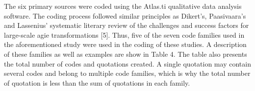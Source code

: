 The six primary sources were coded using the Atlas.ti qualitative data
analysis software. The coding process followed similar principles as
Dikert's, Paasivaara's and Lassenius' systematic literary review of the
challenges and success factors for large-scale agie transformations
[5]. Thus, five of the seven code families used in the aforementioned
study were used in the coding of these studies. A description of
these families as well as examples are show in Table 4. The table
also presents the total number of codes and quotations created. A
single quotation may contain several codes and belong to multiple code
families, which is why the total number of quotation is less than the
sum of quotations in each family.

\bigskip

\bigskip
